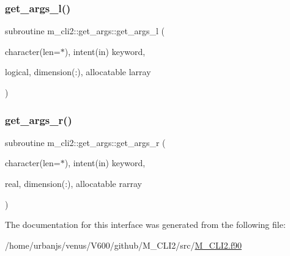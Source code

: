 \mbox{\label{interfacem__cli2_1_1get__args_a63a053bae5bf6f21f66065964276ba24}} 
\subsubsection{\texorpdfstring{get\+\_\+args\+\_\+l()}{get\_args\_l()}}
{\footnotesize\ttfamily subroutine m\+\_\+cli2\+::get\+\_\+args\+::get\+\_\+args\+\_\+l (\begin{DoxyParamCaption}\item[{character(len=$\ast$), intent(in)}]{keyword,  }\item[{logical, dimension(\+:), allocatable}]{larray }\end{DoxyParamCaption})\hspace{0.3cm}{\ttfamily [private]}}

\mbox{\label{interfacem__cli2_1_1get__args_a335a4e76349b577737c8c5c3dcb8ee5c}} 
\subsubsection{\texorpdfstring{get\+\_\+args\+\_\+r()}{get\_args\_r()}}
{\footnotesize\ttfamily subroutine m\+\_\+cli2\+::get\+\_\+args\+::get\+\_\+args\+\_\+r (\begin{DoxyParamCaption}\item[{character(len=$\ast$), intent(in)}]{keyword,  }\item[{real, dimension(\+:), allocatable}]{rarray }\end{DoxyParamCaption})\hspace{0.3cm}{\ttfamily [private]}}



The documentation for this interface was generated from the following file\+:\begin{DoxyCompactItemize}
\item 
/home/urbanjs/venus/\+V600/github/\+M\+\_\+\+C\+L\+I2/src/\mbox{\hyperlink{M__CLI2_8f90}{M\+\_\+\+C\+L\+I2.\+f90}}\end{DoxyCompactItemize}
